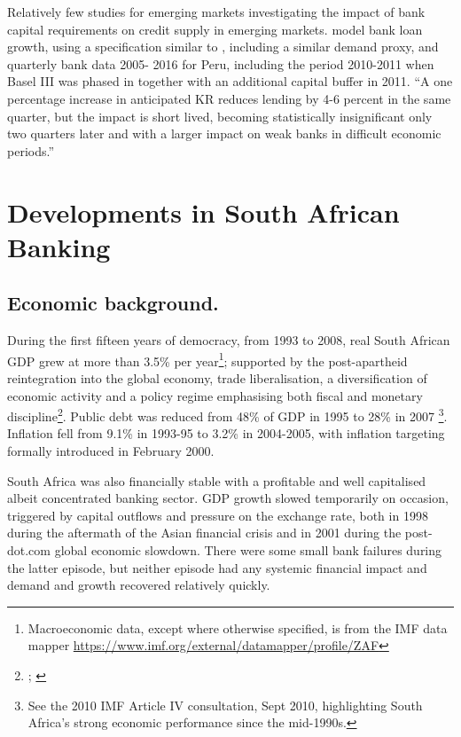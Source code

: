 \documentclass[
  12,
]{article}
\begin{document}
Relatively few studies for emerging markets investigating the impact of bank capital requirements on credit supply in emerging markets. \citet{fang2020bank} model bank loan growth, using a specification similar to \citet{aiyar2016does}, including a similar demand proxy, and quarterly bank data 2005- 2016 for Peru, including the period 2010-2011 when Basel III was phased in together with an additional capital buffer in 2011. ``A one percentage increase in anticipated KR reduces lending by 4-6 percent in the same quarter, but the impact is short lived, becoming statistically insignificant only two quarters later and with a larger impact on weak banks in difficult economic periods.''

\hypertarget{economic}{%
\section{Developments in South African Banking}\label{economic}}

\hypertarget{economic-background.}{%
\subsection{Economic background.}\label{economic-background.}}

During the first fifteen years of democracy, from 1993 to 2008, real South African GDP grew at more than 3.5\% per year\footnote{Macroeconomic data, except where otherwise specified, is from the IMF data mapper \url{https://www.imf.org/external/datamapper/profile/ZAF}}; supported by the post-apartheid reintegration into the global economy, trade liberalisation, a diversification of economic activity and a policy regime emphasising both fiscal and monetary discipline\footnote{\citet{nowak2005first}; \citet{nowak2006post}}. Public debt was reduced from 48\% of GDP in 1995 to 28\% in 2007 \footnote{See the 2010 IMF Article IV consultation, Sept 2010, highlighting South Africa's strong economic performance since the mid-1990s.}. Inflation fell from 9.1\% in 1993-95 to 3.2\% in 2004-2005, with inflation targeting formally introduced in February 2000.

South Africa was also financially stable with a profitable and well capitalised albeit concentrated banking sector. GDP growth slowed temporarily on occasion, triggered by capital outflows and pressure on the exchange rate, both in 1998 during the aftermath of the Asian financial crisis and in 2001 during the post-dot.com global economic slowdown. There were some small bank failures during the latter episode, but neither episode had any systemic financial impact and demand and growth recovered relatively quickly.
\end{document}
